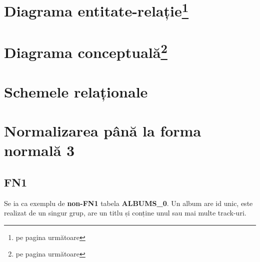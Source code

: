 \documentclass[a4paper, oneside, 12pt]{article}
\newcommand{\rowstyle}[1]{\gdef\currentrowstyle{#1}%
  #1\ignorespaces
}
\begin{document}
\section{Diagrama entitate-relație\footnote{pe pagina următoare}}



\section{Diagrama conceptuală\footnote{pe pagina următoare}}
\label{ldiagconcept}



\section{Schemele relaționale}

\begin{center}



\end{center}

\section{Normalizarea până la forma normală 3}

\subsection{FN1}

Se ia ca exemplu de \textbf{non-FN1} tabela \textbf{ALBUMS\_0}. Un album are id
unic, este realizat de un singur grup, are un titlu și conține unul sau mai multe track-uri.


\begin{table}[h]
\centering
\caption*{Tabela \textbf{ALBUMS\_0}:}
\end{table}
\end{document}
